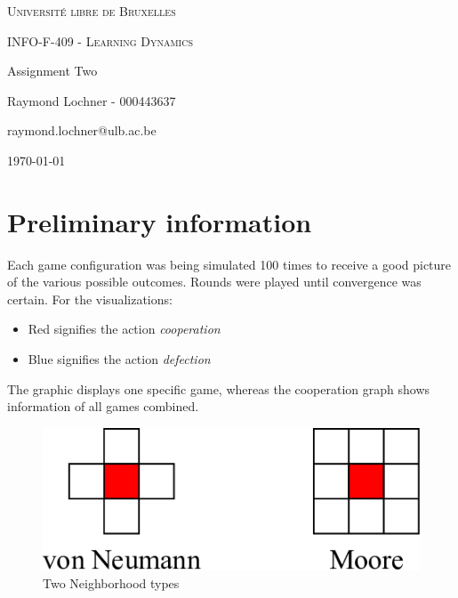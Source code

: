 \documentclass[a4paper, 11pt]{article}
\date{\today}
\begin{document}
\begin{titlepage}
	\centering
	{\scshape\LARGE Université libre de Bruxelles \par}
	\vspace{1cm}
	{\scshape\Large INFO-F-409 - Learning Dynamics\par}
	\vspace{1.5cm}
	{\huge\bfseries {Assignment Two\par}}
	\vspace{2cm}
	{\Large Raymond Lochner - 000443637\par}
	\vspace{0.5cm}
	{\Large raymond.lochner@ulb.ac.be}
	\vfill
	
	\setcounter{tocdepth}{2} %
	\tableofcontents

\vfill
	{\large \today \par}
\end{titlepage}

\newpage

\section*{Preliminary information}

Each game configuration was being simulated 100 times to receive a good picture of the various possible outcomes. Rounds were played until convergence was certain. For the visualizations:
\begin{itemize}[noitemsep]
  \item Red signifies the action \textit{cooperation}
  \item Blue signifies the action \textit{defection}
\end{itemize}

The graphic displays one specific game, whereas the cooperation graph shows information of all games combined.


\begin{figure}[H]
	\centering
    \includegraphics[width=0.9\linewidth]{NeighborhoodType}
    \caption{Two Neighborhood types}
\end{figure}
\end{document}
